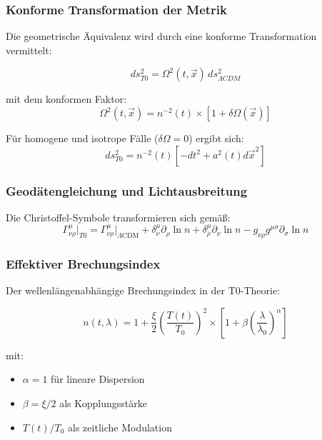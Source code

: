 \documentclass[12pt,a4paper]{article}
\theoremstyle{definition}
\begin{document}
\subsubsection{Konforme Transformation der Metrik}

Die geometrische Äquivalenz wird durch eine konforme Transformation vermittelt:

\begin{equation}
	ds^2_{T0} = \Omega^2(t,\vec{x}) \, ds^2_{\Lambda CDM}
\end{equation}

mit dem konformen Faktor:
\begin{equation}
	\Omega^2(t,\vec{x}) = n^{-2}(t) \times \left[1 + \delta\Omega(\vec{x})\right]
\end{equation}

Für homogene und isotrope Fälle (\(\delta\Omega = 0\)) ergibt sich:
\begin{equation}
	ds^2_{T0} = n^{-2}(t)\left[-dt^2 + a^2(t)d\vec{x}^2\right]
\end{equation}

\subsubsection{Geodätengleichung und Lichtausbreitung}

Die Christoffel-Symbole transformieren sich gemäß:
\begin{equation}
	\Gamma^\mu_{\nu\rho}\bigg|_{T0} = \Gamma^\mu_{\nu\rho}\bigg|_{\Lambda\text{CDM}} + \delta^\mu_\nu \partial_\rho \ln n + \delta^\mu_\rho \partial_\nu \ln n - g_{\nu\rho}g^{\mu\sigma}\partial_\sigma \ln n
\end{equation}

\subsubsection{Effektiver Brechungsindex}

Der wellenlängenabhängige Brechungsindex in der T0-Theorie:

\begin{equation}
	n(t,\lambda) = 1 + \frac{\xi}{2}\left(\frac{T(t)}{T_0}\right)^2 \times \left[1 + \beta\left(\frac{\lambda}{\lambda_0}\right)^\alpha\right]
\end{equation}

mit:
\begin{itemize}
	\item \(\alpha = 1\) für lineare Dispersion
	\item \(\beta = \xi/2\) als Kopplungsstärke
	\item \(T(t)/T_0\) als zeitliche Modulation
\end{itemize}
\end{document}
